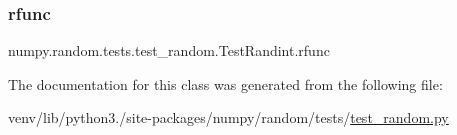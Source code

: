 \subsubsection{\texorpdfstring{rfunc}{rfunc}}
{\footnotesize\ttfamily numpy.\+random.\+tests.\+test\+\_\+random.\+Test\+Randint.\+rfunc\hspace{0.3cm}{\ttfamily [static]}}



The documentation for this class was generated from the following file\+:\begin{DoxyCompactItemize}
\item 
venv/lib/python3./site-\/packages/numpy/random/tests/\hyperlink{test__random_8py}{test\+\_\+random.\+py}\end{DoxyCompactItemize}
